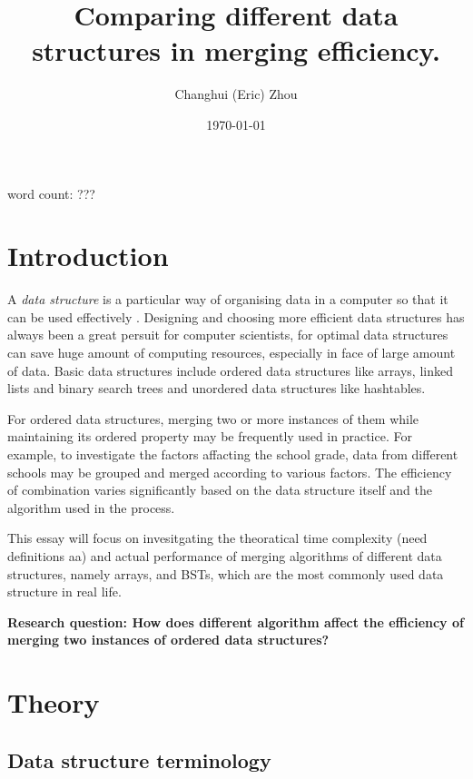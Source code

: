 \documentclass[12pt]{article}
\title{\textbf{Comparing different data structures in merging efficiency.}}
\author{Changhui (Eric) Zhou}
\date{\today}
\begin{document}
\begin{titlepage}
    \maketitle
    \centering word count: ???
\end{titlepage}

\tableofcontents
\clearpage

\section{Introduction}

A \textit{data structure} is a particular way of organising data in a computer so that it can be used effectively \cite{geeksforgeeks_data_structures}. Designing and choosing more efficient data structures has always been a great persuit for computer scientists, for optimal data structures can save huge amount of computing resources, especially in face of large amount of data. Basic data structures include ordered data structures like arrays, linked lists and binary search trees and unordered data structures like hashtables. 

For ordered data structures, merging two or more instances of them while maintaining its ordered property may be frequently used in practice. For example, to investigate the factors affacting the school grade, data from different schools may be grouped and merged according to various factors. The efficiency of combination varies significantly based on the data structure itself and the algorithm used in the process. 

This essay will focus on invesitgating the theoratical time complexity (need definitions aa) and actual performance of merging algorithms of different data structures, namely arrays, and BSTs, which are the most commonly used data structure in real life. 

\textbf{Research question: How does different algorithm affect the efficiency of merging two instances of ordered data structures?}

\section{Theory}

\subsection{Data structure terminology}
\end{document}
